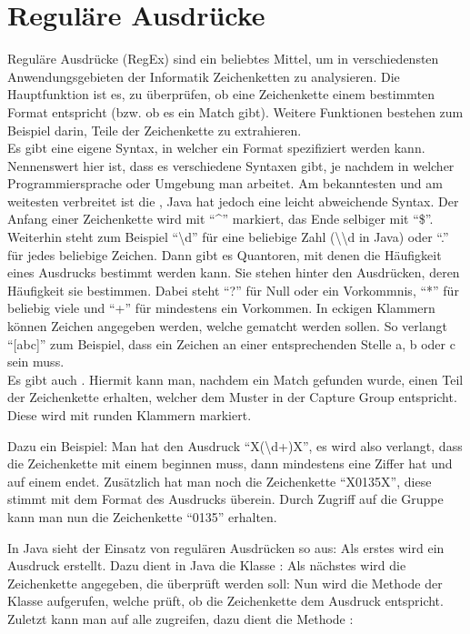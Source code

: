 \section{Reguläre Ausdrücke}

Reguläre Ausdrücke (RegEx) sind ein beliebtes Mittel, um in verschiedensten Anwendungsgebieten der Informatik Zeichenketten zu analysieren.
Die Hauptfunktion ist es, zu überprüfen, ob eine Zeichenkette einem bestimmten Format entspricht (bzw. ob es ein Match gibt).
Weitere Funktionen bestehen zum Beispiel darin, Teile der Zeichenkette zu extrahieren.\\

Es gibt eine eigene Syntax, in welcher ein Format spezifiziert werden kann\cite{regex101}.
Nennenswert hier ist, dass es verschiedene Syntaxen gibt, je nachdem in welcher Programmiersprache oder Umgebung man arbeitet.
Am bekanntesten und am weitesten verbreitet ist die , Java hat jedoch eine leicht abweichende Syntax.
Der Anfang einer Zeichenkette wird mit \enquote{\textasciicircum} markiert, das Ende selbiger mit \enquote{\$}.
Weiterhin steht zum Beispiel \enquote{\textbackslash d} für eine beliebige Zahl (\textbackslash\textbackslash d in Java) oder \enquote{.} für jedes beliebige Zeichen.
Dann gibt es Quantoren, mit denen die Häufigkeit eines Ausdrucks bestimmt werden kann.
Sie stehen hinter den Ausdrücken, deren Häufigkeit sie bestimmen.
Dabei steht \enquote{?} für Null oder ein Vorkommnis, \enquote{*} für beliebig viele und \enquote{+} für mindestens ein Vorkommen.
In eckigen Klammern können Zeichen angegeben werden, welche gematcht werden sollen. So verlangt \enquote{[abc]} zum Beispiel, dass ein Zeichen an einer entsprechenden Stelle a, b oder c sein muss.\\

Es gibt auch . Hiermit kann man, nachdem ein Match gefunden wurde, einen Teil der Zeichenkette erhalten, welcher dem Muster in der Capture Group entspricht. Diese wird mit runden Klammern markiert.

Dazu ein Beispiel: Man hat den Ausdruck \enquote{X(\textbackslash d+)X}, es wird also verlangt, dass die Zeichenkette mit einem  beginnen muss, dann mindestens eine Ziffer hat und auf einem  endet. 
Zusätzlich hat man noch die Zeichenkette \enquote{X0135X}, diese stimmt mit dem Format des Ausdrucks überein.
Durch Zugriff auf die Gruppe kann man nun die Zeichenkette \enquote{0135} erhalten.

In Java sieht der Einsatz von regulären Ausdrücken so aus:
Als erstes wird ein Ausdruck erstellt. Dazu dient in Java die Klasse :
\noindent Als nächstes wird die Zeichenkette angegeben, die überprüft werden soll:
\noindent Nun wird die Methode  der Klasse  aufgerufen, welche prüft, ob die Zeichenkette dem Ausdruck entspricht.
\noindent Zuletzt kann man auf alle  zugreifen, dazu dient die Methode :
